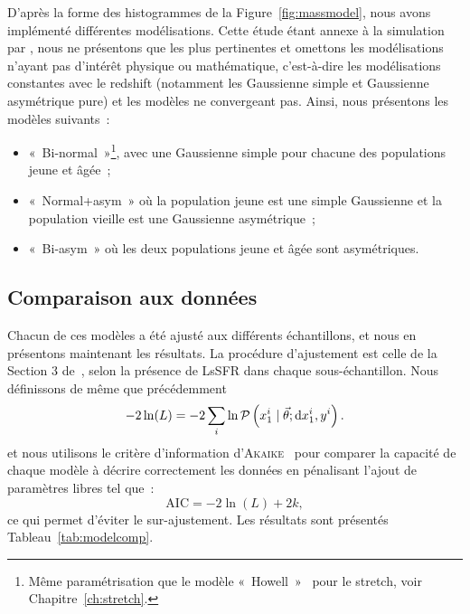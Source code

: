 \documentclass[../main/main.tex]{subfiles}
\begin{document}
D'après la forme des histogrammes de la Figure~\ref{fig:massmodel}, nous avons
implémenté différentes modélisations. Cette étude étant annexe à la simulation
par \snana, nous ne présentons que les plus pertinentes et omettons les
modélisations n'ayant pas d'intérêt physique ou mathématique, c'est-à-dire les
modélisations constantes avec le redshift (notamment les Gaussienne simple et
Gaussienne asymétrique pure) et les modèles ne convergeant pas. Ainsi, nous
présentons les modèles suivants~:
\begin{itemize}
    \item «~Bi-normal~»\footnote{Même paramétrisation que le modèle
            «~Howell~»~\citep{howell2007} pour le stretch, voir
        Chapitre~\ref{ch:stretch}.}, avec une Gaussienne simple pour chacune des
        populations jeune et âgée~;

    \item «~Normal+asym~» où la population jeune est une simple Gaussienne et la
        population vieille est une Gaussienne asymétrique~;

    \item «~Bi-asym~» où les deux populations jeune et âgée sont asymétriques.
\end{itemize}

\subsection{Comparaison aux données}\label{ssec:mres}

Chacun de ces modèles a été ajusté aux différents échantillons, et nous en
présentons maintenant les résultats. La procédure d'ajustement est celle de la
Section 3 de~, selon la présence de LsSFR dans chaque
sous-échantillon. Nous définissons de même que précédemment
\begin{equation}\label{eq:likelihood2}
    -2\ln(L) = -2 \sum_i \ln \mathcal{P}\left(x_1^i \mid \vec{\theta};
    \mathrm{d}x_1^i, y^i\right).
\end{equation}
et nous utilisons le critère d'information
d'\textsc{Akaike}~\citep[AIC,][]{burnham2004} pour comparer la capacité de
chaque modèle à décrire correctement les données en pénalisant l'ajout de
paramètres libres tel que~:
\begin{equation}
    \mathrm{AIC} = -2\ln(L) + 2k,
\end{equation}
ce qui permet d'éviter le sur-ajustement. Les résultats sont présentés
Tableau~\ref{tab:modelcomp}.
\end{document}
